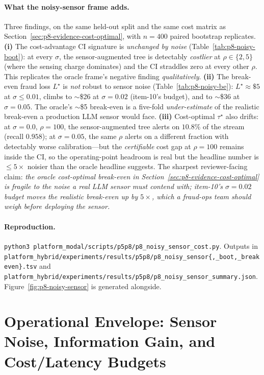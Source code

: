 \documentclass{article}
\providecommand{\secref}[1]{Section~\ref{#1}}
\begin{document}
\paragraph{What the noisy-sensor frame adds.} Three findings, on the
same held-out split and the same cost matrix as
\secref{sec:p8-evidence-cost-optimal}, with $n{=}400$ paired bootstrap
replicates. \textbf{(i)} The cost-advantage CI signature is
\emph{unchanged by noise} (Table~\ref{tab:p8-noisy-boot}): at every
$\sigma$, the sensor-augmented tree is detectably \emph{costlier} at
$\rho \in \{2,5\}$ (where the sensing charge dominates) and the CI
straddles zero at every other $\rho$. This replicates the oracle frame's
negative finding \emph{qualitatively}. \textbf{(ii)} The break-even
fraud loss $L^\star$ is \emph{not} robust to sensor noise
(Table~\ref{tab:p8-noisy-be}): $L^\star \approx \$5$ at $\sigma \le 0.01$,
climbs to $\sim$\$26 at $\sigma{=}0.02$ (item-10's budget), and to
$\sim$\$36 at $\sigma{=}0.05$. The oracle's $\sim$\$5 break-even is a
five-fold \emph{under-estimate} of the realistic break-even a
production LLM sensor would face. \textbf{(iii)} Cost-optimal
$\tau^\star$ also drifts: at $\sigma{=}0.0$, $\rho{=}100$, the
sensor-augmented tree alerts on $10.8\%$ of the stream (recall
$0.958$); at $\sigma{=}0.05$, the same $\rho$ alerts on a different
fraction with detectably worse calibration---but the
\emph{certifiable} cost gap at $\rho{=}100$ remains inside the CI, so
the operating-point headroom is real but the headline number is
$\le 5\times$ noisier than the oracle headline suggests. The sharpest
reviewer-facing claim: \emph{the oracle cost-optimal break-even in
\secref{sec:p8-evidence-cost-optimal} is fragile to the noise a real
LLM sensor must contend with; item-10's $\sigma{=}0.02$ budget moves
the realistic break-even up by $5\times$, which a fraud-ops team
should weigh before deploying the sensor.}

\paragraph{Reproduction.}
\texttt{python3 platform\_modal/scripts/p5p8/p8\_noisy\_sensor\_cost.py}. Outputs in
\texttt{platform\_hybrid/experiments/results/p5p8/p8\_noisy\_sensor\{,\_boot,\_breakeven\}.tsv}
and \texttt{platform\_hybrid/experiments/results/p5p8/p8\_noisy\_sensor\_summary.json}.
Figure~\ref{fig:p8-noisy-sensor} is generated alongside.
 \section{Operational Envelope: Sensor Noise, Information Gain, and Cost/Latency Budgets}
\label{sec:p8-evidence-noise}
\end{document}
